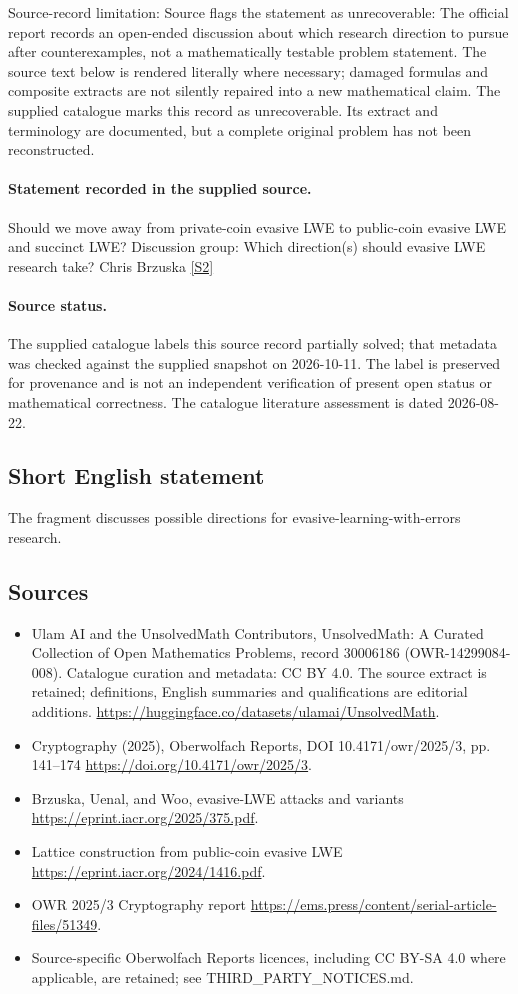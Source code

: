 \documentclass[11pt]{article}
\begin{document}
Source-record limitation: Source flags the statement as unrecoverable: The official report records an open-ended discussion about which research direction to pursue after counterexamples, not a mathematically testable problem statement.
The source text below is rendered literally where necessary; damaged formulas and composite extracts are not silently repaired into a new mathematical claim.
The supplied catalogue marks this record as unrecoverable. Its extract and terminology are documented, but a complete original problem has not been reconstructed.
\paragraph{Statement recorded in the supplied source.}
Should we move away from private-coin evasive LWE to public-coin evasive LWE and succinct LWE? Discussion group: Which direction(s) should evasive LWE research take? Chris Brzuska \href{https://doi.org/10.4171/owr/2025/3}{[S2]}
\paragraph{Source status.}
The supplied catalogue labels this source record partially solved; that metadata was checked against the supplied snapshot on 2026-10-11. The label is preserved for provenance and is not an independent verification of present open status or mathematical correctness. The catalogue literature assessment is dated 2026-08-22.
\subsection{Short English statement}
The fragment discusses possible directions for evasive-learning-with-errors research.
\subsection{Sources}
\begin{itemize}
\item[S1] Ulam AI and the UnsolvedMath Contributors, UnsolvedMath: A Curated Collection of Open Mathematics Problems, record 30006186 (OWR-14299084-008). Catalogue curation and metadata: CC BY 4.0. The source extract is retained; definitions, English summaries and qualifications are editorial additions.
\url{https://huggingface.co/datasets/ulamai/UnsolvedMath}.
\item[S2] Cryptography (2025), Oberwolfach Reports, DOI 10.4171/owr/2025/3, pp. 141--174
\url{https://doi.org/10.4171/owr/2025/3}.
\item[S3] Brzuska, Uenal, and Woo, evasive-LWE attacks and variants
\url{https://eprint.iacr.org/2025/375.pdf}.
\item[S4] Lattice construction from public-coin evasive LWE
\url{https://eprint.iacr.org/2024/1416.pdf}.
\item[S5] OWR 2025/3 Cryptography report
\url{https://ems.press/content/serial-article-files/51349}.
\item Source-specific Oberwolfach Reports licences, including CC BY-SA 4.0 where applicable, are retained; see THIRD\_PARTY\_NOTICES.md.
\end{itemize}
\end{document}
